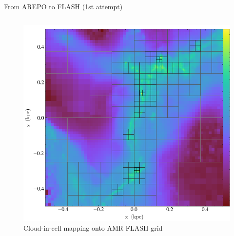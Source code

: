 \documentclass[aspectratio=169]{beamer}
\begin{document}
\begin{frame}{From AREPO to FLASH} {(1st attempt)}
\begin{columns}
\begin{column}{0.35\textwidth}
\begin{figure}[h!]
                \includegraphics[width=\linewidth]{../images/cloud_in_cell_projection_lvl8.png} \\
                Cloud-in-cell mapping onto AMR FLASH grid
                \label{fig:amr_example}
            \end{figure}
        \end{column}
    \end{columns}
\end{frame} 
%
%
%
%
%
\end{document}
